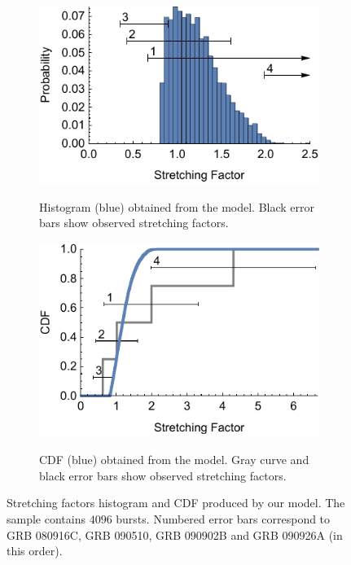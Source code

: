 \documentclass{article}
\begin{document}
\begin{figure}
	\hspace*{\fill}
	\begin{subfigure}{0.45\textwidth}
		\includegraphics[width=\textwidth]{kappaDistributionHistogram}
		\label{fig:kappaDistributionHistogram}
		\caption{Histogram (blue) obtained from the model. Black error bars show observed stretching factors.}
	\end{subfigure}
	\hfill
	\begin{subfigure}{0.45\textwidth}
		\includegraphics[width=\textwidth]{kappaDistributionCDF}
		\label{fig:kappaDistributionCDF}
		\caption{CDF (blue) obtained from the model. Gray curve and black error bars show observed stretching factors.}
	\end{subfigure}
	\hspace*{\fill}
	\caption{
		Stretching factors histogram and CDF produced by our model.
		The sample contains $4096$ bursts.
		Numbered error bars correspond to GRB 080916C, GRB 090510, GRB 090902B and GRB 090926A (in this order).
	}
	\label{fig:kappaDistribution}
\end{figure}
\end{document}
